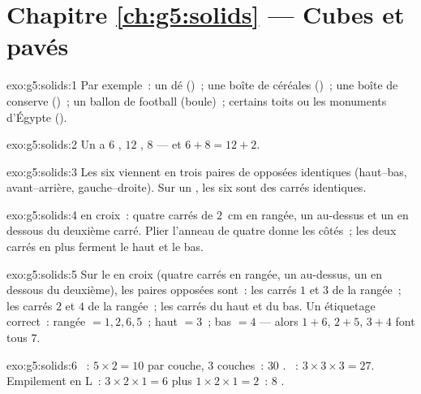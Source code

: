 \section*{Chapitre \ref{ch:g5:solids} --- Cubes et pavés}

\begin{solution}{exo:g5:solids:1}
Par exemple~: un dé ()~; une boîte de céréales ()~; une
boîte de conserve ()~; un ballon de football (boule)~;
certains toits ou les monuments d'Égypte ().
\end{solution}

\begin{solution}{exo:g5:solids:2}
Un  a $6$ , $12$ , $8$  --- et
$6 + 8 = 12 + 2$. \checkmark
\end{solution}

\begin{solution}{exo:g5:solids:3}
Les six  viennent en trois paires de  opposées
identiques (haut--bas, avant--arrière, gauche--droite). Sur un
, les six  sont des carrés identiques.
\end{solution}

\begin{solution}{exo:g5:solids:4}
 en croix~: quatre carrés de $2$~cm en rangée, un au-dessus
et un en dessous du deuxième carré. Plier l'anneau de quatre donne
les côtés~; les deux carrés en plus ferment le haut et le bas.
\end{solution}

\begin{solution}{exo:g5:solids:5}
Sur le  en croix (quatre carrés en rangée, un au-dessus, un
en dessous du deuxième), les paires opposées sont~: les carrés $1$
et $3$ de la rangée~; les carrés $2$ et $4$ de la rangée~; les
carrés du haut et du bas. Un étiquetage correct~: rangée $= 1, 2,
6, 5$~; haut $= 3$~; bas $= 4$ --- alors $1{+}6$, $2{+}5$, $3{+}4$
font tous $7$.
\end{solution}

\begin{solution}{exo:g5:solids:6}
~: $5 \times 2 = 10$ par couche, $3$ couches~: $30$ .
~: $3 \times 3 \times 3 = 27$. Empilement en L~:
$3 \times 2 \times 1 = 6$ plus $1 \times 2 \times 1 = 2$~: $8$
.
\end{solution}

